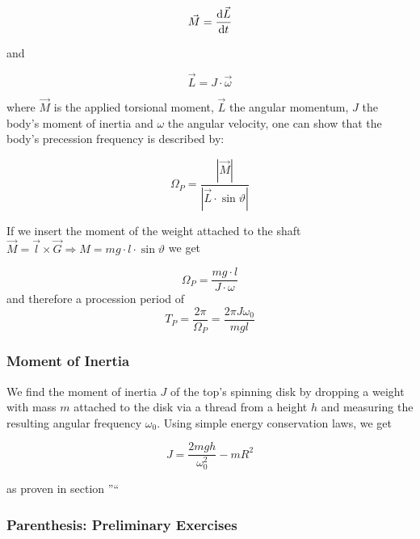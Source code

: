 \documentclass{scrreprt}
\begin{document}
\begin{equation}
\vec{M} = \frac{\dif \vec{L}}{\dif t}
\end{equation}

and

\begin{equation}
\vec{L} = J \cdot \vec{\omega}
\end{equation}

where $\vec{M}$ is the applied torsional moment, $\vec{L}$ the angular momentum, $J$ the body's moment of inertia and $\omega$ the angular velocity, one can show that the body's precession frequency is described by:

\begin{equation}
\Omega_P = \frac{|\vec{M}|}{|\vec{L}\cdot \sin \vartheta|}
\end{equation}

If we insert the moment of the weight attached to the shaft $\vec{M} = \vec{l} \times \vec{G} \Rightarrow M = m g \cdot l \cdot \sin \vartheta$ we get

\begin{equation}
\Omega_P = \frac{mg\cdot l}{J\cdot \omega}
\end{equation}
and therefore a procession period of
\begin{equation}
T_P = \frac{2\pi}{\Omega_P} = \frac{2\pi J \omega_0}{mgl}
\end{equation}

\subsubsection{Moment of Inertia}

We find the moment of inertia $J$ of the top's spinning disk by dropping a weight with mass $m$ attached to the disk via a thread from a height $h$ and measuring the resulting angular frequency $\omega_0$. Using simple energy conservation laws, we get

\begin{equation}
\label{eq:inertia}
J = \frac{2mgh}{\omega_0^2} - m R^2
\end{equation}

as proven in section ''``

\subsubsection{Parenthesis: Preliminary Exercises}
\label{sec:preliminary_exercises}
\end{document}
